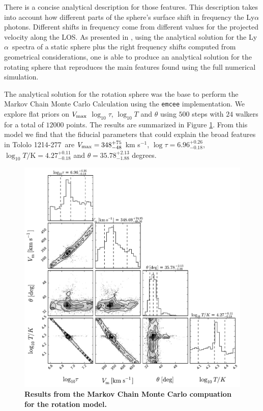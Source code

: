 \documentclass[a4paper, usenatbib, 12pt]{article}
\newcommand{\tol}{Tololo 1214-277}
\newcommand{\lya}{Ly$\alpha$}
\begin{document}
{There is a concise analytical description for those features.
This description takes into account how different parts of the
sphere's surface shift in frequency the \lya photons. 
Different shifts in frequency come from different values for the projected
velocity along the LOS. 
As presented in \cite{CLARA}, using the analytical solution for the
\lya\ spectra of a static sphere plus the right frequency shifts
computed from geometrical considerations, one is able to produce an
analytical solution for the rotating sphere that reproduces the main
features found using the full numerical simulation.

The analytical solution for the rotation sphere was the base to
perform the Markov Chain Monte Carlo Calculation using the
\texttt{emcee} implementation.
We explore flat priors on $V_{\rm max}$ $\log_{10}\tau$, $\log_{10} T$ and
$\theta$ using $500$ steps with $24$ walkers for a total of $12000$
points.
The results are summarized in Figure \ref{emceeresults}. 
From this model we find that the fiducial parameters that could
explain the broad features in \tol\ are $V_{\rm max}=348^{+75}_{-48}$
km s$^{-1}$, $\log \tau = 6.96^{+0.26}_{-0.18}$, $\log_{10} T/\mathrm
{K} = 4.27^{+0.11}_{-0.18}$ and  $\theta = 35.78^{+2.13}_{-1.88}$ degrees.


\begin{figure}
\begin{center}
\includegraphics[width=1.0\textwidth]{emcee_results.pdf}
\caption{{\bf Results from the Markov Chain Monte Carlo compuation for
    the rotation model.}\label{emceeresults}} 
\end{center}
\end{figure}


}
\end{document}
